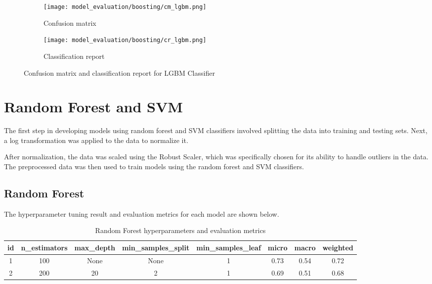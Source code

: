 \begin{figure}[H]
    \centering
    \begin{subfigure}[b]{0.5\textwidth}
        \texttt{[image: model\_evaluation/boosting/cm\_lgbm.png]}
        \caption{Confusion matrix}
    \end{subfigure}
    \hfill
    \begin{subfigure}[b]{0.4\textwidth}
        \texttt{[image: model\_evaluation/boosting/cr\_lgbm.png]}
        \caption{Classification report}
    \end{subfigure}
    \caption{Confusion matrix and classification report for LGBM Classifier}
\end{figure}

\section{Random Forest and SVM}
The first step in developing models using random forest and SVM classifiers involved splitting the data into training and testing sets. Next, a log transformation was applied to the data to normalize it.

After normalization, the data was scaled using the Robust Scaler, which was specifically chosen for its ability to handle outliers in the data. The preprocessed data was then used to train models using the random forest and SVM classifiers.


\subsection{Random Forest}
The hyperparameter tuning result and evaluation metrics for each model are shown below.

\begin{table}[H]
    \begin{center}
        \begin{tabular}{ |c|c|c|c|c|c|c|c| }
            \hline
            id & n\_estimators & max\_depth & min\_samples\_split & min\_samples\_leaf  & micro & macro & weighted \\
            \hline
            1 & 100 & None  & None  & 1 & 0.73  & 0.54  & 0.72     \\
            \hline        
            2 & 200 & 20  & 2  & 1 & 0.69  & 0.51  & 0.68     \\
            \hline
        \end{tabular}
    \end{center}
    \caption{Random Forest hyperparameters and evaluation metrics}
\end{table}

